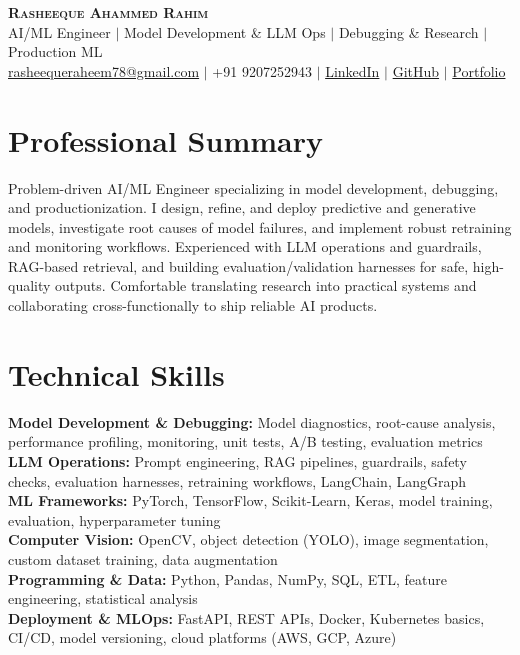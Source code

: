 \documentclass[letterpaper,11pt]{article}
\begin{document}
\begin{center}
    \textbf{\Huge \scshape Rasheeque Ahammed Rahim} \\ \vspace{1pt}
  \small AI/ML Engineer $|$ Model Development \& LLM Ops $|$ Debugging \& Research $|$ Production ML \\ \vspace{4pt}
    \small \href{mailto:rasheequeraheem78@gmail.com}{rasheequeraheem78@gmail.com} $|$ 
    +91 9207252943 $|$ 
    \href{https://www.linkedin.com/in/rasheeque-ahammed-raheem-aa777325a}{LinkedIn} $|$
    \href{https://github.com/Rasheequeahammed}{GitHub} $|$
    \href{https://rasheequeahammed.github.io/Rasheeque-PortFolio/}{Portfolio}
\end{center}
\vspace{-3pt}

\section{Professional Summary}
  \small{Problem-driven AI/ML Engineer specializing in model development, debugging, and productionization. I design, refine, and deploy predictive and generative models, investigate root causes of model failures, and implement robust retraining and monitoring workflows. Experienced with LLM operations and guardrails, RAG-based retrieval, and building evaluation/validation harnesses for safe, high-quality outputs. Comfortable translating research into practical systems and collaborating cross-functionally to ship reliable AI products.}
\vspace{-6pt}

\section{Technical Skills}
 \begin{itemize}[leftmargin=0.15in, label={}]
    \small{\item{
  \textbf{Model Development \& Debugging:} Model diagnostics, root-cause analysis, performance profiling, monitoring, unit tests, A/B testing, evaluation metrics \\
  \textbf{LLM Operations:} Prompt engineering, RAG pipelines, guardrails, safety checks, evaluation harnesses, retraining workflows, LangChain, LangGraph \\
  \textbf{ML Frameworks:} PyTorch, TensorFlow, Scikit-Learn, Keras, model training, evaluation, hyperparameter tuning \\
  \textbf{Computer Vision:} OpenCV, object detection (YOLO), image segmentation, custom dataset training, data augmentation \\
  \textbf{Programming \& Data:} Python, Pandas, NumPy, SQL, ETL, feature engineering, statistical analysis \\
  \textbf{Deployment \& MLOps:} FastAPI, REST APIs, Docker, Kubernetes basics, CI/CD, model versioning, cloud platforms (AWS, GCP, Azure)
    }}
 \end{itemize}
 \vspace{-8pt}
\end{document}
